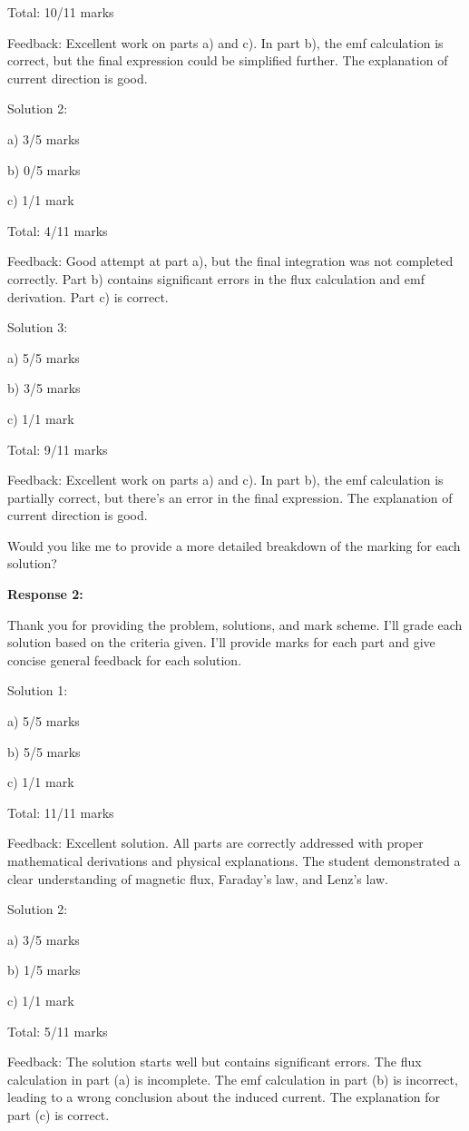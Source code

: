 \documentclass[a4paper,11pt]{article}
\begin{document}
Total: 10/11 marks

Feedback: Excellent work on parts a) and c). In part b), the emf calculation is correct, but the final expression could be simplified further. The explanation of current direction is good.

Solution 2:

a) 3/5 marks

b) 0/5 marks

c) 1/1 mark

Total: 4/11 marks

Feedback: Good attempt at part a), but the final integration was not completed correctly. Part b) contains significant errors in the flux calculation and emf derivation. Part c) is correct.

Solution 3:

a) 5/5 marks

b) 3/5 marks

c) 1/1 mark

Total: 9/11 marks

Feedback: Excellent work on parts a) and c). In part b), the emf calculation is partially correct, but there's an error in the final expression. The explanation of current direction is good.

Would you like me to provide a more detailed breakdown of the marking for each solution?

\bigskip
\textbf{Response 2:}

Thank you for providing the problem, solutions, and mark scheme. I'll grade each solution based on the criteria given. I'll provide marks for each part and give concise general feedback for each solution.

Solution 1:

a) 5/5 marks

b) 5/5 marks

c) 1/1 mark

Total: 11/11 marks

Feedback: Excellent solution. All parts are correctly addressed with proper mathematical derivations and physical explanations. The student demonstrated a clear understanding of magnetic flux, Faraday's law, and Lenz's law.

Solution 2:

a) 3/5 marks

b) 1/5 marks

c) 1/1 mark

Total: 5/11 marks

Feedback: The solution starts well but contains significant errors. The flux calculation in part (a) is incomplete. The emf calculation in part (b) is incorrect, leading to a wrong conclusion about the induced current. The explanation for part (c) is correct.
\end{document}
